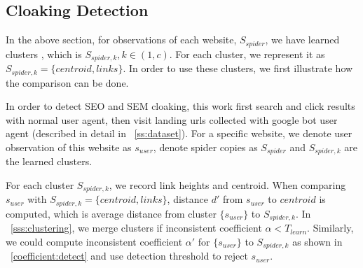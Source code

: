 %



%
%
%


%

\subsection{Cloaking Detection}
In the above section, for observations of each website, $S_{spider}$, we have 
learned clusters , which is $S_{spider, k}, k \in (1, c)$. For each cluster, we
represent it as $S_{spider, k} = \{centroid, links\}$.
In order to use these clusters, we first illustrate how the comparison can be
done.

In order to detect SEO and SEM cloaking,
this work first search and click results with normal user agent, then visit 
landing urls collected with google bot user agent (described in detail in
~\autoref{ss:dataset}).
For a specific website, we denote user observation of this website as
$s_{user}$, denote spider copies as $S_{spider}$ and 
$S_{spider, k}$ are the learned clusters.

For each cluster $S_{spider, k}$, we record link heights and centroid.
When comparing $s_{user}$ with $S_{spider, k} = \{centroid, links\}$, 
distance $d'$ from $s_{user}$ to $centroid$ is computed, which is average distance
from cluster $\{s_{user}\}$ to $S_{spider, k}$. In ~\autoref{sss:clustering}, we
merge clusters if inconsistent coefficient $\alpha < T_{learn}$. Similarly, we
could compute inconsistent coefficient $\alpha'$ for $\{s_{user}\}$ to $S_{spider, k}$ as
shown in ~\autoref{coefficient:detect} and use detection threshold to reject
$s_{user}$.

